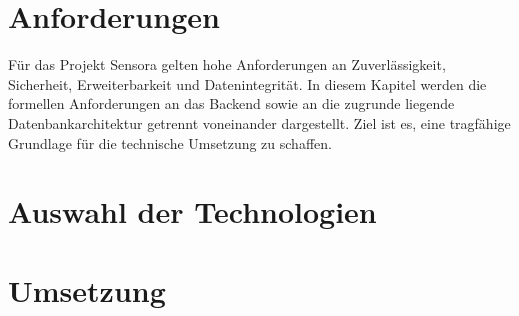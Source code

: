 \documentclass[a4paper,12pt]{report}
\begin{document}
	\newpage
	
	\chapter{Anforderungen}
        

        Für das Projekt Sensora gelten hohe Anforderungen an Zuverlässigkeit, Sicherheit, Erweiterbarkeit und Datenintegrität. In diesem Kapitel werden die formellen Anforderungen an das Backend sowie an die zugrunde liegende Datenbankarchitektur getrennt voneinander dargestellt. Ziel ist es, eine tragfähige Grundlage für die technische Umsetzung zu schaffen.
        
        
        
	    
	
	\newpage
	
	\chapter{Auswahl der Technologien}
        
	
	
	
        
	
	
        
    
    

	
	\newpage
	
	\chapter{Umsetzung}
        
        
        
	
        
	
        
    
    

	\newpage

	
	
\end{document}
